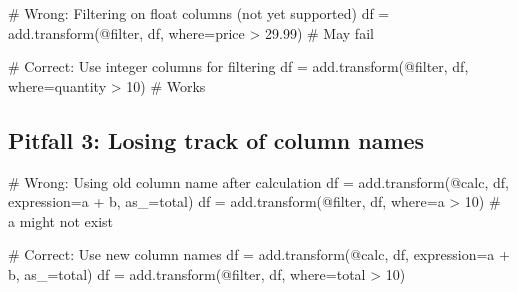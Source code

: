 \documentclass[
  letterpaper,
]{scrbook}
\newenvironment{Shaded}{\begin{snugshade}}{\end{snugshade}}
\newcommand{\CommentTok}[1]{\textcolor[rgb]{0.37,0.37,0.37}{#1}}
\newcommand{\NormalTok}[1]{\textcolor[rgb]{0.00,0.23,0.31}{#1}}
\newcommand{\OperatorTok}[1]{\textcolor[rgb]{0.37,0.37,0.37}{#1}}
\newcommand{\StringTok}[1]{\textcolor[rgb]{0.13,0.47,0.30}{#1}}
\begin{document}
\begin{Shaded}
\begin{Highlighting}[]
\CommentTok{\# Wrong: Filtering on float columns (not yet supported)}
\NormalTok{df }\OperatorTok{=}\NormalTok{ add.transform(}\StringTok{\textquotesingle{}@filter\textquotesingle{}}\NormalTok{, df, where}\OperatorTok{=}\StringTok{\textquotesingle{}price \textgreater{} 29.99\textquotesingle{}}\NormalTok{)  }\CommentTok{\# May fail}

\CommentTok{\# Correct: Use integer columns for filtering}
\NormalTok{df }\OperatorTok{=}\NormalTok{ add.transform(}\StringTok{\textquotesingle{}@filter\textquotesingle{}}\NormalTok{, df, where}\OperatorTok{=}\StringTok{\textquotesingle{}quantity \textgreater{} 10\textquotesingle{}}\NormalTok{)  }\CommentTok{\# Works}
\end{Highlighting}
\end{Shaded}

\subsection{Pitfall 3: Losing track of column
names}\label{pitfall-3-losing-track-of-column-names}

\begin{Shaded}
\begin{Highlighting}[]
\CommentTok{\# Wrong: Using old column name after calculation}
\NormalTok{df }\OperatorTok{=}\NormalTok{ add.transform(}\StringTok{\textquotesingle{}@calc\textquotesingle{}}\NormalTok{, df, expression}\OperatorTok{=}\StringTok{\textquotesingle{}a + b\textquotesingle{}}\NormalTok{, as\_}\OperatorTok{=}\StringTok{\textquotesingle{}total\textquotesingle{}}\NormalTok{)}
\NormalTok{df }\OperatorTok{=}\NormalTok{ add.transform(}\StringTok{\textquotesingle{}@filter\textquotesingle{}}\NormalTok{, df, where}\OperatorTok{=}\StringTok{\textquotesingle{}a \textgreater{} 10\textquotesingle{}}\NormalTok{)  }\CommentTok{\# \textquotesingle{}a\textquotesingle{} might not exist}

\CommentTok{\# Correct: Use new column names}
\NormalTok{df }\OperatorTok{=}\NormalTok{ add.transform(}\StringTok{\textquotesingle{}@calc\textquotesingle{}}\NormalTok{, df, expression}\OperatorTok{=}\StringTok{\textquotesingle{}a + b\textquotesingle{}}\NormalTok{, as\_}\OperatorTok{=}\StringTok{\textquotesingle{}total\textquotesingle{}}\NormalTok{)}
\NormalTok{df }\OperatorTok{=}\NormalTok{ add.transform(}\StringTok{\textquotesingle{}@filter\textquotesingle{}}\NormalTok{, df, where}\OperatorTok{=}\StringTok{\textquotesingle{}total \textgreater{} 10\textquotesingle{}}\NormalTok{)}
\end{Highlighting}
\end{Shaded}
\end{document}
